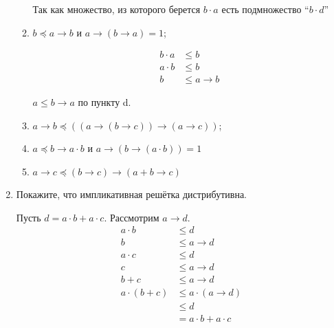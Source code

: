 \begin{enumerate}
\begin{enumerate}
                    Так как множество, из которого берется \(b\cdot a\) есть подмножество ``\(b\cdot d\)''

              \item $b \preceq a \rightarrow b$ и $a \rightarrow (b \rightarrow a) = 1$;

                    \begin{align*}
                        b\cdot a & \leq b       \\
                        a\cdot b & \leq b       \\
                        b        & \leq a \to b
                    \end{align*}

                    \(a \leq b \to a\) по пункту d.

              \item $a \rightarrow b \preceq ((a \rightarrow (b \rightarrow c)) \rightarrow (a \rightarrow c))$;
              \item $a \preceq b \rightarrow a \cdot b$ и $a \rightarrow (b \rightarrow (a \cdot b)) = 1$
              \item $a \rightarrow c \preceq (b \rightarrow c) \rightarrow (a + b \rightarrow c)$
          \end{enumerate}

    \item Покажите, что импликативная решётка дистрибутивна.

          Пусть \(d = a \cdot b + a \cdot c\). Рассмотрим \(a \to d\).
          \begin{align}
              a \cdot b      & \leq d \label{по построению}            \\
              b              & \leq a \to d \label{по определению to}  \\
              a \cdot c      & \leq d \label{по построению2}           \\
              c              & \leq a \to d \label{по определению to2} \\
              b + c          & \leq a \to d \label{из предыдущих}      \\
              a\cdot (b + c) & \leq a \cdot (a \to d)                  \\
                             & \leq d                                  \\
                             & = a\cdot b + a\cdot c
          \end{align}


\end{enumerate}
